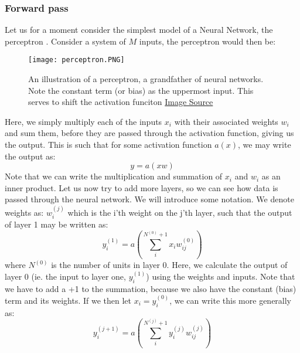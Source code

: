 \documentclass[12pt]{article}
\begin{document}
{\subsubsection{Forward pass}
Let us for a moment consider the simplest model of a Neural Network, the perceptron \cite{NN1969}. Consider a system of $M$ inputs, the perceptron would then be:
\begin{figure}[ht!]
    \centering
    \texttt{[image: perceptron.PNG]}
    \caption{An illustration of a perceptron, a grandfather of neural networks. Note the constant term (or bias) as the uppermost input. This serves to shift the activation funciton
    \newline \href{https://arxiv.org/pdf/1708.06008}{Image Source}
    }
    \label{fig:perceptron}
\end{figure}
\newline
Here, we simply multiply each of the inputs $x_i$ with their associated weights $w_i$ and sum them, before they are passed through the activation function, giving us the output. This is such that for some activation function $a(x)$, we may write the output as:
\begin{equation*}
    y = a(x w)
\end{equation*}
Note that we can write the multiplication and summation of $x_i$ and $w_i$ as an inner product.
\newline
Let us now try to add more layers, so we can see how data is passed through the neural network. We will introduce some notation. We denote weights as: $w_{i}^{(j)}$ which is the i'th weight on the j'th layer, such that the output of layer 1 may be written as:
\begin{equation*}
    y_i^{(1)} = a \left( \sum_{i}^{N^{(0)} + 1} x_i w_{ij}^{(0)} \right)
\end{equation*}
where $N^{(0)}$ is the number of units in layer 0. \newline
Here, we calculate the output of layer 0 (ie. the input to layer one, $y_i^{(1)}$) using the weights and inputs. Note that we have to add a +1 to the summation, because we also have the constant (bias) term and its weights. \newline
If we then let $x_i = y_i^{(0)}$, we can write this more generally as:
\begin{equation} \label{output}
    y_i^{(j+1)} = a \left(\sum_{i}^{N^{(j)} + 1} y_i^{(j)} w_{ij}^{(j)} \right)
\end{equation}
}
\end{document}
